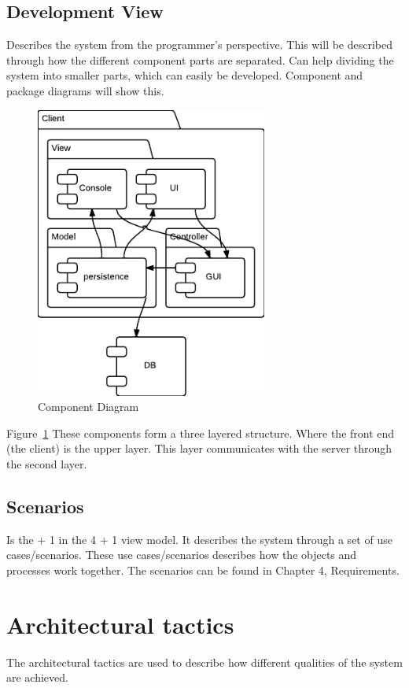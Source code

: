 \subsection{Development View}
Describes the system from the programmer's perspective. This will be described through how the different component parts are separated. Can help dividing the system into smaller parts, which can easily be developed. Component and package diagrams will show this.

\begin{figure}[h]
\centering
\includegraphics[width=3in]{image/architecture/ComponentDiagram.png}
\caption{Component Diagram}
\label{figure:ComponentDiagram}
\end{figure}

Figure~\ref{figure:ComponentDiagram} These components form a three layered structure. Where the front end (the client) is the upper layer. This layer communicates with the server through the second layer.


\subsection{Scenarios}
Is the + 1 in the 4 + 1 view model. It describes the system through a set of use cases/scenarios. These use cases/scenarios describes how the objects and processes work together. The scenarios can be found in Chapter 4, Requirements.



\section{Architectural tactics} \label{Tactics}
The architectural tactics are used to describe how different qualities of the system are achieved. 

